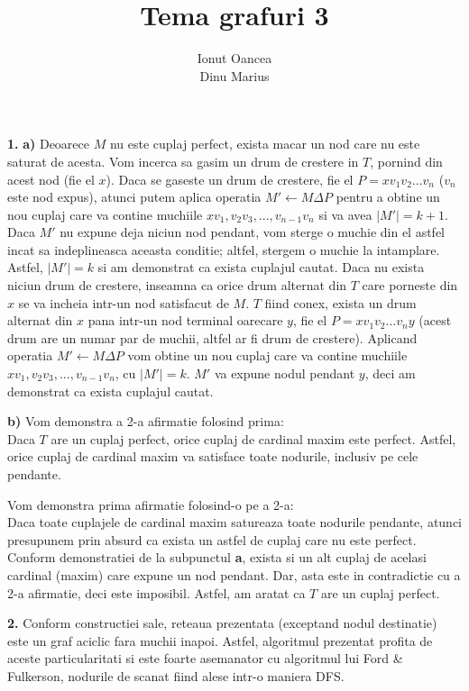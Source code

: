 \documentclass{article}
\title{Tema grafuri 3}
\author{Ionut Oancea \\Dinu Marius}
\date{}
\begin{document}
\maketitle

{\bf 1.} {\bf a)} Deoarece $M$ nu este cuplaj perfect, exista macar un nod care nu este saturat de acesta. Vom incerca sa gasim un drum de crestere in $T$, pornind din acest nod (fie el $x$). Daca se gaseste un drum de crestere, fie el $P = xv_1v_2...v_n$ ($v_n$ este nod expus), atunci putem aplica operatia $M' \gets M \Delta P$ pentru a obtine un nou cuplaj care va contine muchiile $xv_1, v_2v_3,...,v_{n-1}v_n$ si va avea $|M'| = k+1$. Daca $M'$ nu expune deja niciun nod pendant, vom sterge o muchie din el astfel incat sa indeplineasca aceasta conditie; altfel, stergem o muchie la intamplare. Astfel, $|M'| = k$ si am demonstrat ca exista cuplajul cautat. Daca nu exista niciun drum de crestere, inseamna ca orice drum alternat din $T$ care porneste din $x$ se va incheia intr-un nod satisfacut de $M$. $T$ fiind conex, exista un drum alternat din $x$ pana intr-un nod terminal oarecare $y$, fie el $P = xv_1v_2...v_ny$ (acest drum are un numar par de muchii, altfel ar fi drum de crestere). Aplicand operatia $M' \gets M \Delta P$ vom obtine un nou cuplaj care va contine muchiile $xv_1, v_2v_3,..., v_{n-1}v_n$, cu $|M'| = k$. $M'$ va expune nodul pendant $y$, deci am demonstrat ca exista cuplajul cautat.

{\bf b)} Vom demonstra a 2-a afirmatie folosind prima:\\
Daca $T$ are un cuplaj perfect, orice cuplaj de cardinal maxim este perfect. Astfel, orice cuplaj de cardinal maxim va satisface toate nodurile, inclusiv pe cele pendante.

Vom demonstra prima afirmatie folosind-o pe a 2-a:\\
Daca toate cuplajele de cardinal maxim satureaza toate nodurile pendante, atunci presupunem prin absurd ca exista un astfel de cuplaj care nu este perfect. Conform demonstratiei de la subpunctul {\bf a}, exista si un alt cuplaj de acelasi cardinal (maxim) care expune un nod pendant. Dar, asta este in contradictie cu a 2-a afirmatie, deci este imposibil. Astfel, am aratat ca $T$ are un cuplaj perfect.

\vspace{1cm}

{\bf 2.} Conform constructiei sale, reteaua prezentata (exceptand nodul destinatie) este un graf aciclic fara muchii inapoi. Astfel, algoritmul prezentat profita de aceste particularitati si este foarte asemanator cu algoritmul lui Ford \& Fulkerson, nodurile de scanat fiind alese intr-o maniera DFS. 
\end{document}
